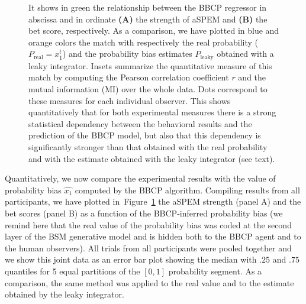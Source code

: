 \documentclass[12pt,english]{article}%
\newcommand{\seeFig}[1]{Figure~\ref{fig:#1}}
\begin{document}
\begin{figure}
{%
It shows in green the relationship between the BBCP regressor in abscissa
and in ordinate \textbf{(A)} the strength of aSPEM and \textbf{(B)} the bet score, respectively.
As a comparison, we have plotted in blue and orange colors the match
with respectively 
the real probability ($P_{\text{real}}=x_1^t$) and
the probability bias estimates $P_{\text{leaky}}$ obtained with a leaky integrator.
Insets summarize the quantitative measure of this match 
by computing the Pearson correlation coefficient $r$ 
and the mutual information (MI) over the whole data.
Dots correspond to these measures for each individual observer.
This shows quantitatively that for both experimental measures
there is a strong statistical dependency between
the behavioral results and the prediction of the BBCP model,
but also that this dependency is significantly stronger than that obtained
with the real probability and with the estimate obtained with the leaky integrator
(see text). %
}
\label{fig:results_psycho_all}
\end{figure}
Quantitatively, we now compare the experimental results
with the value of probability bias $\hat{x_1}$
computed by the BBCP algorithm.
Compiling results %
from all participants,
we have plotted in~\seeFig{results_psycho_all}
the aSPEM strength (panel A) and the bet scores (panel B) as a function of the BBCP-inferred probability bias
(we remind here that the real value of the probability bias was coded at the second layer of the BSM generative model and is hidden both to the BBCP agent and to the human observers).
All trials from all participants were pooled together 
and we show this joint data as an error bar plot 
showing the median with $.25$ and $.75$ quantiles
for 5 equal partitions of the $[0, 1]$ probability segment. %
As a comparison, the same method was applied to the real value and 
to the estimate obtained by the leaky integrator.
\end{document}
